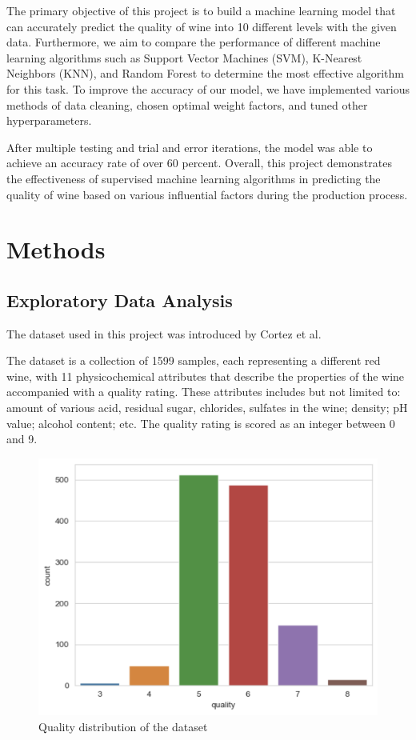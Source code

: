 \documentclass[conference]{IEEEtran}
\begin{document}
The primary objective of this project is to build a machine learning model that can accurately predict the quality of wine into 10 different levels with the given data. Furthermore, we aim to compare the performance of different machine learning algorithms such as Support Vector Machines (SVM), K-Nearest Neighbors (KNN), and Random Forest to determine the most effective algorithm for this task. To improve the accuracy of our model, we have implemented various methods of data cleaning, chosen optimal weight factors, and tuned other hyperparameters.

After multiple testing and trial and error iterations, the model was able to achieve an accuracy rate of over 60 percent. Overall, this project demonstrates the effectiveness of supervised machine learning algorithms in predicting the quality of wine based on various influential factors during the production process.\\

\section{Methods}
\subsection{Exploratory Data Analysis}


The dataset used in this project was introduced by Cortez et al.\cite{b2}

The dataset is a collection of 1599 samples, each representing a different red wine, with 11 physicochemical attributes that describe the properties of the wine accompanied with a quality rating. These attributes includes but not limited to: amount of various acid, residual sugar, chlorides, sulfates in the wine; density; pH value; alcohol content; etc. The quality rating is scored as an integer between 0 and 9.




	\begin{figure}[h]
	\label{fig:foo}
	\begin{center}
	\includegraphics[scale=0.35]{quality.png}
	\caption{Quality distribution of the dataset}
	\end{center}
	\end{figure}
\end{document}
